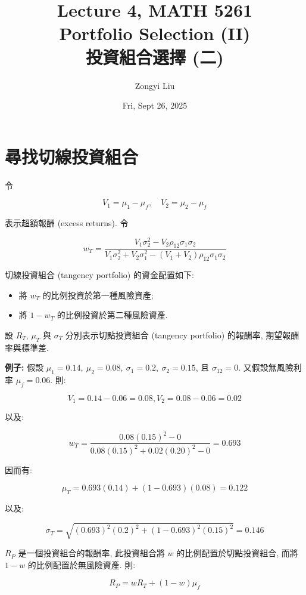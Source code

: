 \documentclass[letterpaper]{article}
\title{Lecture 4, MATH 5261 \\
		\small{Portfolio Selection (II) \\
			投資組合選擇 (二) 
		}
	}
\author{Zongyi Liu}
\date{Fri, Sept 26, 2025}
\begin{document}
		\maketitle
		
		\tableofcontents
		
		
		\section{尋找切線投資組合}
		令
		
		$$
		V_{1}=\mu_{1}-\mu_{f}, \quad V_{2}=\mu_{2}-\mu_{f}
		$$
		
		表示超額報酬 (excess returns). 令
		
		$$
		w_{T}=\frac{V_{1} \sigma_{2}^{2}-V_{2} \rho_{12} \sigma_{1} \sigma_{2}}{V_{1} \sigma_{2}^{2}+V_{2} \sigma_{1}^{2}-\left (V_{1}+V_{2}\right) \rho_{12} \sigma_{1} \sigma_{2}}
		$$
		
		切線投資組合 (tangency portfolio) 的資金配置如下: 
		
		\begin{itemize}
			\item 將 $w_{T}$ 的比例投資於第一種風險資產; 
			\item 將 $1 - w_{T}$ 的比例投資於第二種風險資產. \\
		\end{itemize}
		
		設 $R_{T}$, $\mu_{T}$ 與 $\sigma_{T}$ 分別表示切點投資組合 (tangency portfolio) 的報酬率, 期望報酬率與標準差. 
		
		\textbf{例子: }假設 $\mu_{1} = 0.14, \ \mu_{2} = 0.08, \ \sigma_{1} = 0.2, \ \sigma_{2} = 0.15$, 且 $\sigma_{12} = 0$. 又假設無風險利率 $\mu_{f} = 0.06$. 則: 
		
		
		$$
		V_{1}=0.14-0.06=0.08, V_{2}=0.08-0.06=0.02
		$$
		
		以及: 
		
		$$
		w_{T}=\frac{0.08 (0.15) ^{2}-0}{0.08 (0.15) ^{2}+0.02 (0.20) ^{2}-0}=0.693
		$$
		
		因而有: 
		
		$$
		\mu_{T}=0.693 (0.14) + (1-0.693) (0.08) =0.122
		$$
		
		以及: 
		
		$$
		\sigma_{T}=\sqrt{ (0.693) ^{2} (0.2) ^{2}+ (1-0.693) ^{2} (0.15) ^{2}}=0.146
		$$
		
		$R_{P}$ 是一個投資組合的報酬率, 此投資組合將 $w$ 的比例配置於切點投資組合, 而將 $1 - w$ 的比例配置於無風險資產. 則: 
		
		
		$$
		R_{P}=w R_{T}+ (1-w) \mu_{f}
		$$
		
\end{document}
